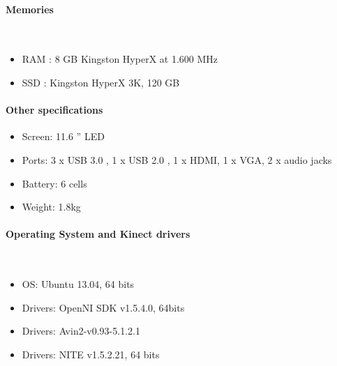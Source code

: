 		\vspace*{0.5cm}

	\paragraph{Memories} \mbox{}\\
		\begin{itemize}
			\item{RAM : 8 GB Kingston HyperX at 1.600 MHz }
			\item{SSD : Kingston HyperX 3K, 120 GB}
		\end{itemize}
		\vspace*{0.5cm}

	\paragraph{Other specifications}
		\begin{itemize}
			\item{Screen: 11.6 '' LED }
			\item{Ports: 3 x USB 3.0 , 1 x USB 2.0 , 1 x HDMI, 1 x VGA, 2 x audio jacks}
			\item{Battery: 6 cells}
			\item{Weight: 1.8kg}
		\end{itemize}
		\vspace*{0.5cm}

	\paragraph{Operating System and Kinect drivers}\mbbox{}\\
		\begin{itemize}
			\item{OS: Ubuntu 13.04, 64 bits}
			\item{Drivers: OpenNI SDK v1.5.4.0, 64bits}
			\item{Drivers: Avin2-v0.93-5.1.2.1}
			\item{Drivers: NITE v1.5.2.21, 64 bits}

		\end{itemize}
		\vspace*{0.5cm}


